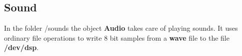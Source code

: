 \subsection{Sound}
In the folder /sounds the object {\bf Audio} takes care of playing sounds. It uses ordinary
file operations to write 8 bit samples from a {\bf wave} file to the file {\bf /dev/dsp}.
